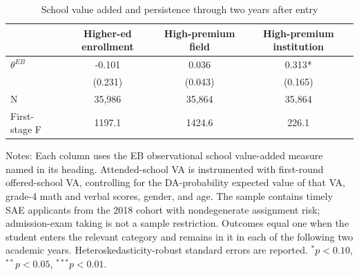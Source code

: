 \begin{table}[!htbp]
\centering
\caption{School value added and persistence through two years after entry}
\label{tab:va-higher-ed-persistence-two-year}
\begin{threeparttable}
\begin{tabular}{lccc}
\toprule
 & Higher-ed enrollment & High-premium field & High-premium institution \\
\midrule
$\theta^{EB}$ & -0.101 & 0.036 & 0.313* \\
 & (0.231) & (0.043) & (0.165) \\
N & 35,986 & 35,864 & 35,864 \\
First-stage F & 1197.1 & 1424.6 & 226.1 \\
\bottomrule
\end{tabular}
\begin{tablenotes}[flushleft]
\footnotesize
\item Notes: Each column uses the EB observational school value-added measure named in its heading. Attended-school VA is instrumented with first-round offered-school VA, controlling for the DA-probability expected value of that VA, grade-4 math and verbal scores, gender, and age. The sample contains timely SAE applicants from the 2018 cohort with nondegenerate assignment risk; admission-exam taking is not a sample restriction. Outcomes equal one when the student enters the relevant category and remains in it in each of the following two academic years. Heteroskedasticity-robust standard errors are reported. $^{*}p<0.10$, $^{**}p<0.05$, $^{***}p<0.01$.
\end{tablenotes}
\end{threeparttable}
\end{table}
